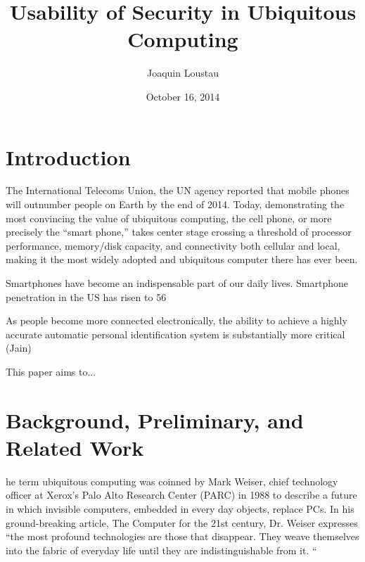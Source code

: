\documentclass{article}
\title{Usability of Security in Ubiquitous Computing}
\author{Joaquin Loustau}
\date{October 16, 2014}
\begin{document}
\maketitle


\pagebreak
\tableofcontents

\pagebreak

%
%
\section{Introduction}
\label{introduction}

The International Telecoms Union, the UN agency reported that mobile phones will outnumber people on Earth by the end of 2014. Today, demonstrating the most convincing the value of ubiquitous computing, the cell phone, or more precisely the “smart phone,” takes center stage crossing a threshold of processor performance, memory/disk capacity, and connectivity both cellular and local, making it the most widely adopted and ubiquitous computer there has ever been.

Smartphones have become an indispensable part of our daily lives. Smartphone penetration in the US has risen to 56%

As people become more connected electronically, the ability to achieve a highly accurate automatic personal identification system is substantially more critical (Jain)

This paper aims to...


\section{Background, Preliminary, and Related Work}
he term ubiquitous computing was coinned by Mark Weiser, chief technology officer at Xerox’s Palo Alto Research Center (PARC) in 1988 to describe a future in which invisible computers, embedded in every day objects, replace PCs. In his ground-breaking article, The Computer for the 21st century, Dr. Weiser expresses “the most profound technologies are those that disappear. They weave themselves into the fabric of everyday life until they are indistinguishable from it. “
\end{document}
